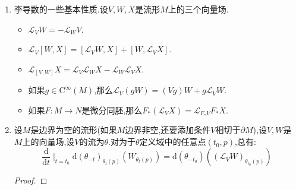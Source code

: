 \begin{enumerate}
\begin{proof}
		把$V$的所有正则点(即$V_p\not=0$的全部$p$)记作$\mathscr{R}(V)$,连续性保证$\mathscr{R}(V)$是$M$的开子集,并且它的闭包就是$\mathrm{Supp}V$.我们来对$p\in M$分情况证明$(\mathscr{L}_VW)_p=[V,W]_p$.
		
		情况1:$p\in\mathscr{R}(V)$.我们证明过此时存在$p$附近的坐标卡$(U,(u^i))$使得$V$具有坐标表示$V=\partial/\partial u^1$.此时$V$的流的坐标表示为$\theta_t(u)=(u^1+t,u^2,\cdots,u^n)$.此时$\mathrm{d}(\theta_{-t})_{\theta_t(x)}$的Jacobian矩阵处处是单位矩阵.所以对每个$u\in U$就有:
		$$\mathrm{d}(\theta_{-t})_{\theta_t(u)}(W_{\theta_t(u)})=\sum_jW^j(u^1+t,u^2,\cdots,u^n)\frac{\partial}{\partial u^j}\mid_u$$
		
		于是按照李导数定义就有如下等式,而这恰好是李括号$[\partial/\partial u^1,W]$的坐标表示.$$(\mathscr{L}_VW)_u=\sum_j\frac{\mathrm{d}}{\mathrm{d}t}\mid_{t=0}W^j(u^1+t,u^2,\cdots,u^n)\frac{\partial}{\partial u^j}\mid_u=\sum_j\frac{\partial W^j}{\partial u^1}(u^1,\cdots,u^n)\frac{\partial}{\partial u^j}\mid_i$$
		
	    情况2:$p\in\mathrm{Supp}V$.因为$\mathrm{Supp}V$是$\mathscr{R}(V)$的闭包,按照$(\mathscr{L}_VW)_p$和$[V,W]_p$都是关于$p$连续的,从它们在$\mathscr{R}(V)$上相等就得到在闭包$\mathrm{Supp}(V)$上也相等.
	    
	    情况3:$p\in M-\mathrm{Supp}V$.此时$V$在$p$的某个开邻域上恒为零.所以一方面$\theta_t$应该在$p$的某个开邻域上恒为恒等映射,这里$t$是任取的,所以就有$\mathrm{d}(\theta_{-t})_{\theta_t(p)}(W_{\theta_t(p)})=W_p$.所以$(\mathscr{L}_VW)_p=0$.另一方面按照李括号的坐标表示也有$[V,W]_p=0$.
	\end{proof}
	\item 李导数的一些基本性质.设$V,W,X$是流形$M$上的三个向量场.
	\begin{itemize}
		\item $\mathscr{L}_VW=-\mathscr{L}_WV$.
		\item $\mathscr{L}_V[W,X]=[\mathscr{L}_VW,X]+[W,\mathscr{L}_VX]$.
		\item $\mathscr{L}_{[V,W]}X=\mathscr{L}_V\mathscr{L}_WX-\mathscr{L}_W\mathscr{L}_VX$.
		\item 如果$g\in\mathrm{C}^{\infty}(M)$,那么$\mathscr{L}_V(gW)=(Vg)W+g\mathscr{L}_VW$.
		\item 如果$F:M\to N$是微分同胚,那么$F_*(\mathscr{L}_VX)=\mathscr{L}_{F_*V}F_*X$.
	\end{itemize}
	\item 设$M$是边界为空的流形(如果$M$边界非空,还要添加条件$V$相切于$\partial M$),设$V,W$是$M$上的向量场,设$V$的流为$\theta$.对为于$\theta$定义域中的任意点$(t_0,p)$,总有:
	$$\frac{\mathrm{d}}{\mathrm{d}t}\mid_{t=t_0}\mathrm{d}(\theta_{-t})_{\theta_{t}(p)}(W_{\theta_t(p)})=\mathrm{d}(\theta_{-t_0})\left((\mathscr{L}_VW)_{\theta_{t_0}(p)}\right)$$
	\begin{proof}
		

\end{proof}
\end{enumerate}
